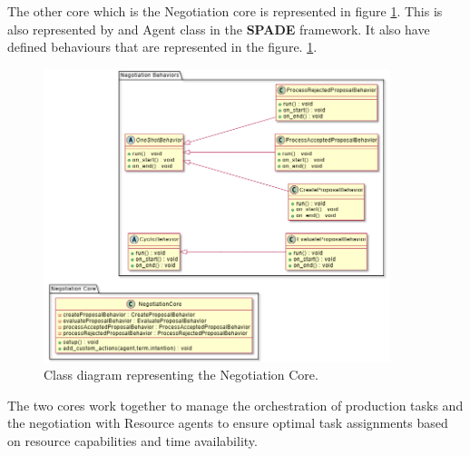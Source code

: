The other core which is the Negotiation core is represented in figure \ref{fig:negotiation_core_classes}.
This is also represented by and Agent class in the \textbf{SPADE} framework.
It also have defined behaviours that are represented in the figure. \ref{fig:negotiation_core_classes}.
\begin{figure}[ht]
    \centering
    \includegraphics[width=0.9\textwidth]{Images/Production_Classes/Agent_Core/Negotiation_Core.png}
    \caption{Class diagram representing the Negotiation Core.}
    \label{fig:negotiation_core_classes}
\end{figure}

The two cores work together to manage the orchestration of production tasks and the negotiation with Resource agents to ensure optimal task assignments based on resource capabilities and time availability.

